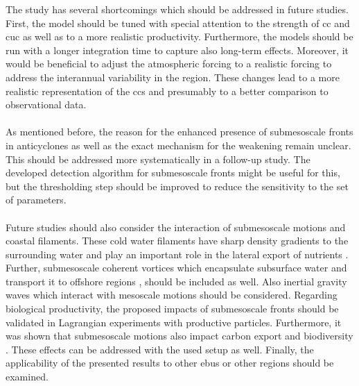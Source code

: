 The study has several shortcomings which should be addressed in future studies. First, the model should be tuned with special attention to the strength of \ac{cc} and \ac{cuc} as well as to a more realistic productivity. Furthermore, the models should be run with a longer integration time to capture also long-term effects. Moreover, it would be beneficial to adjust the atmospheric forcing to a realistic forcing to address the interannual variability in the region. These changes lead to a more realistic representation of the \ac{ccs} and presumably to a better comparison to observational data.\\
\\
As mentioned before, the reason for the enhanced presence of submesoscale fronts in anticyclones as well as the exact mechanism for the weakening remain unclear. This should be addressed more systematically in a follow-up study. The developed detection algorithm for submesoscale fronts might be useful for this, but the thresholding step should be improved to reduce the sensitivity to the set of parameters.\\
\\
Future studies should also consider the interaction of submesoscale motions and coastal filaments. These cold water filaments have sharp density gradients to the surrounding water and play an important role in the lateral export of nutrients \autocite{nagai-2015-dom-role-meso}. Further, submesoscale coherent vortices which encapsulate subsurface water and transport it to offshore regions \autocite{frenger-2018-puddies}, should be included as well. Also inertial gravity waves which interact with mesoscale motions \autocite{klein-2019-review-subm} should be considered. Regarding biological productivity, the proposed impacts of submesoscale fronts should be validated in Lagrangian experiments with productive particles. Furthermore, it was shown that submesoscale motions also impact carbon export \autocite{omand-2015-poc-export, stukel-2017-carbon-export} and biodiversity \autocite{levy-2018-role-structuring}. These effects can be addressed with the used setup as well. Finally, the applicability of the presented results to other \ac{ebus} or other regions should be examined.